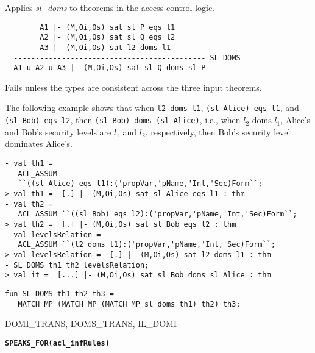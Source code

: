 \SYNOPSIS
Applies \emph{sl\_doms} to theorems in the access-control logic.

\DESCRIBE

\begin{verbatim}
        A1 |- (M,Oi,Os) sat sl P eqs l1
        A2 |- (M,Oi,Os) sat sl Q eqs l2
        A3 |- (M,Oi,Os) sat l2 doms l1
  -------------------------------------------- SL_DOMS
  A1 u A2 u A3 |- (M,Oi,Os) sat sl Q doms sl P
\end{verbatim}

\FAILURE 
Fails unless the types are consistent across the three
input theorems.

\EXAMPLE 
The following example shows that when \texttt{l2 doms l1},
\texttt{(sl Alice) eqs l1}, and \texttt{(sl Bob) eqs l2}, then
\texttt{(sl Bob) doms (sl Alice)}, i.e., when $l_2 \text{ doms }l_1$,
Alice's and Bob's security levels are $l_1$ and $l_2$, respectively,
then Bob's security level dominates Alice's.
\begin{holboxed}
\begin{verbatim}
- val th1 = 
   ACL_ASSUM 
   ``((sl Alice) eqs l1):('propVar,'pName,'Int,'Sec)Form``;
> val th1 =  [.] |- (M,Oi,Os) sat sl Alice eqs l1 : thm
- val th2 = 
   ACL_ASSUM ``((sl Bob) eqs l2):('propVar,'pName,'Int,'Sec)Form``;
> val th2 =  [.] |- (M,Oi,Os) sat sl Bob eqs l2 : thm
- val levelsRelation = 
   ACL_ASSUM ``(l2 doms l1):('propVar,'pName,'Int,'Sec)Form``;
> val levelsRelation =  [.] |- (M,Oi,Os) sat l2 doms l1 : thm
- SL_DOMS th1 th2 levelsRelation;
> val it =  [...] |- (M,Oi,Os) sat sl Bob doms sl Alice : thm
\end{verbatim}
\end{holboxed}


\IMPLEMENTATION
\begin{holboxed}
\begin{verbatim}
fun SL_DOMS th1 th2 th3 =
   MATCH_MP (MATCH_MP (MATCH_MP sl_doms th1) th2) th3;
\end{verbatim}
\end{holboxed}

\SEEALSO
DOMI\_TRANS, DOMS\_TRANS, IL\_DOMI
\ENDDOC

\begin{holboxed}
  \begin{Large}
    \textbf{\texttt{SPEAKS_FOR}}\hfill{}\textbf{\texttt{(acl\_infRules)}}
  \end{Large}
\end{holboxed}

